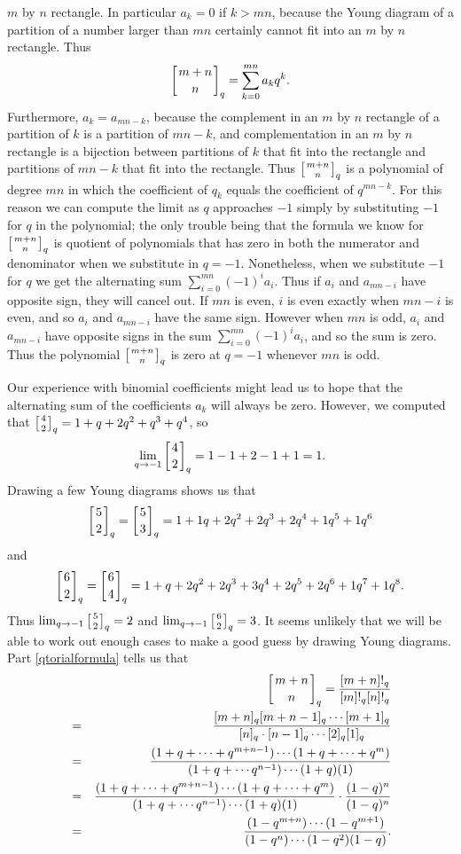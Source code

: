 \begin{enumerate}
{$m$ by $n$ rectangle.  In particular $a_k=0$ if $k>mn$, because the Young
diagram of a partition of a number larger than $mn$ certainly cannot fit into
an $m$ by $n$ rectangle.  Thus
$$\left[{m+n\atop n}\right]_q=\sum_{k=0}^{mn} a_kq^k.$$
Furthermore, $a_k=a_{mn-k}$, because the complement in an $m$ by $n$ rectangle
of a partition of $k$ is a partition of $mn-k$, and complementation in an $m$
by $n$ rectangle is a bijection between partitions of $k$ that fit into the
rectangle and partitions of $mn-k$ that fit into the rectangle.  Thus
$\left[{m+n\atop n}\right]_q$ is a polynomial of degree $mn$ in which the coefficient of
$q_k$ equals the coefficient of $q^{mn-k}$.  For this reason we can compute the
limit as $q$ approaches $-1$ simply by substituting $-1$ for $q$ in the
polynomial; the only trouble being that the formula we know for
$\left[{m+n\atop n}\right]_q$ is quotient of polynomials that has zero in both the
numerator and denominator when we substitute in $q=-1$.  Nonetheless, when we
substitute $-1$ for $q$ we get the alternating sum $\sum_{i=0}^{mn} (-1)^ia_i$. 
Thus if $a_i$ and $a_{mn-i}$ have opposite sign, they will cancel out.  If $mn$
is even, $i$ is even exactly when $mn-i$ is even, and so $a_i$ and $a_{mn-i}$
have the same sign.  However when $mn$ is odd, $a_i$ and $a_{mn-i}$ have
opposite signs in the sum $\sum_{i=0}^{mn} (-1)^ia_i$, and so the sum is zero. 
Thus the polynomial
$\left[{m+n\atop n}\right]_q$ is zero at $q=-1$ whenever $mn$ is odd.

Our experience with binomial coefficients might lead us to hope that the
alternating sum of the coefficients $a_k$ will always be zero.  However, we
computed that
$\left[{4\atop2}\right]_q=1+q+2q^2+q^3+q^4$, so 
$$\lim_{q\rightarrow -1}\left[{4\atop2}\right]_q=1-1+2-1+1=1.$$ 
\iffalse Drawing a few Young
diagrams shows us that
$$\left[{5\atop2}\right]_q=\left[{5\atop3}\right]_q=1+1q+2q^2+2q^3+2q^4+1q^5+1q^6$$ and
$$\left[{6\atop2}\right]_q=\left[{6\atop4}\right]_q=1+q+2q^2+2q^3+3q^4+2q^5+2q^6+1q^7+1q^8.$$
Thus $\lim_{q\rightarrow-1}\left[{5\atop2}\right]_q=2$ and
$\lim_{q\rightarrow-1}\left[{6\atop2}\right]_q=3$.  It seems unlikely that we will be
able to work out enough cases to make a good guess by drawing Young diagrams. 
Part \ref{qtorialformula} tells us that
\begin{eqnarray*}&&\left[{m+n\atop n}\right]_q = {[m+n]!_q \over
[m]!_q[n]!_q}\\
&=&{[m+n]_q[m+n-1]_q\cdots[m+1]_q\over [n]_q\cdot[n-1]_q\cdots [2]_q[1]_q}\\
&=&{(1+q+\cdots+q^{m+n-1})\cdots(1+q+\cdots+q^{m})\over (1+q+\cdots
q^{n-1})\cdots(1+q)(1)}\\
&=&{(1+q+\cdots+q^{m+n-1})\cdots(1+q+\cdots+q^{m})\over (1+q+\cdots
q^{n-1})\cdots(1+q)(1)}\cdot{(1-q)^n\over (1-q)^n}\\
&=&{(1-q^{m+n})\cdots(1-q^{m+1})\over (1-
q^{n})\cdots(1-q^2)(1-q)}.
\end{eqnarray*}

}
\end{enumerate}
